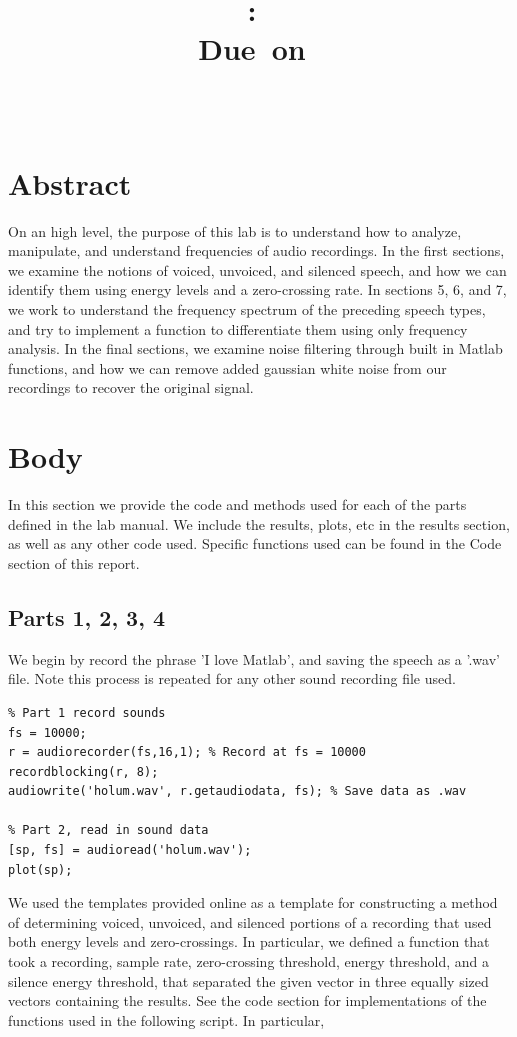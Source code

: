 \documentclass[11pt]{article}
\title{
\vspace{2in}
\textmd{\textbf{\hmwkClass:\ \hmwkTitle}}\\
\normalsize\vspace{0.1in}\small{Due\ on\ \hmwkDueDate}\\
\vspace{0.1in}\large{\textit{\hmwkClassInstructor\ \hmwkClassTime}}
\vspace{3in}
}
\author{\textbf{\hmwkAuthorName}}
\date{} %
\begin{document}


\section{Abstract}

On an high level, the purpose of this lab is to understand how to analyze, manipulate, and understand frequencies of audio recordings. In the first sections, we examine the notions of voiced, unvoiced, and silenced speech, and how we can identify them using energy levels and a zero-crossing rate. In sections 5, 6, and 7, we work to understand the frequency spectrum of the preceding speech types, and try to implement a function to differentiate them using only frequency analysis. In the final sections, we examine noise filtering through built in Matlab functions, and how we can remove added gaussian white noise from our recordings to recover the original signal.

\section{Body}
In this section we provide the code and methods used for each of the parts defined in the lab manual. We include the results, plots, etc in the results section, as well as any other code used. Specific functions used can be found in the Code section of this report.

\subsection{Parts 1, 2, 3, 4}
% 
%
We begin by record the phrase 'I love Matlab', and saving the speech as a '.wav' file. Note this process is repeated for any other sound recording file used.
\begin{lstlisting} 
% Part 1 record sounds
fs = 10000;
r = audiorecorder(fs,16,1); % Record at fs = 10000
recordblocking(r, 8);
audiowrite('holum.wav', r.getaudiodata, fs); % Save data as .wav

% Part 2, read in sound data
[sp, fs] = audioread('holum.wav');
plot(sp);
\end{lstlisting}

We used the templates provided online as a template for constructing a method of determining voiced, unvoiced, and silenced portions of a recording that used both energy levels and zero-crossings. In particular, we defined a function that took a recording, sample rate, zero-crossing threshold, energy threshold, and a silence energy threshold, that separated the given vector in three equally sized vectors containing the results. See the code section for implementations of the functions used in the following script. In particular, 
\end{document}
